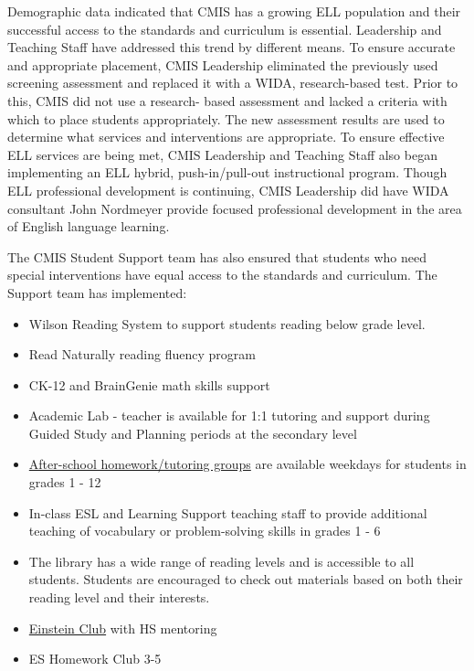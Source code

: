\documentclass{report}
\begin{document}
\begin{findings}

Demographic data indicated that CMIS has a growing ELL  population and their successful access to the standards and curriculum is essential. Leadership and Teaching Staff have addressed this trend by different means. To ensure accurate and appropriate placement, CMIS Leadership eliminated the previously used screening assessment and replaced it with a WIDA, research-based test. Prior to this, CMIS did not use a research- based assessment and lacked a criteria with which to place students appropriately. The new assessment results are used to determine what services and interventions are appropriate. To ensure effective ELL  services are being met, CMIS Leadership and Teaching Staff also began implementing an ELL hybrid, push-in/pull-out instructional program. Though ELL professional development is continuing, CMIS Leadership did have WIDA consultant John Nordmeyer provide focused professional development in the area of English language learning. 


The CMIS Student Support team has also ensured that students who need special interventions have equal access to the standards and curriculum. The Support team has implemented:

\begin{itemize}
\item Wilson Reading System to support students reading below grade level.
\item Read Naturally reading fluency program
\item CK-12 and BrainGenie math skills support
\item Academic Lab - teacher is available for 1:1 tutoring and support during Guided Study and Planning periods at the secondary level
\item \href{https://docs.google.com/a/cmis.ac.th/spreadsheets/d/1JIQuOTYKcg2-y5Mi9wyM2RJpjW4RhCMfMmdPbrNycK8/edit?usp=sharing}{After-school homework/tutoring groups} are available weekdays for students in grades 1 - 12
\item In-class ESL and Learning Support teaching staff to provide additional teaching of vocabulary or problem-solving skills in grades 1 - 6
\item The library has a wide range of reading levels and is accessible to all students.  Students are encouraged to check out materials based on both their reading level and their interests.
\item \href{https://docs.google.com/a/cmis.ac.th/spreadsheets/d/15ipMxaVhlYTso-qKvMgiyaEIvFXVe_ikZ91zQGL9-zU/edit?usp=sharing}{Einstein Club} with HS mentoring 
\item ES Homework Club 3-5
\end{itemize}


\end{findings}
\end{document}
